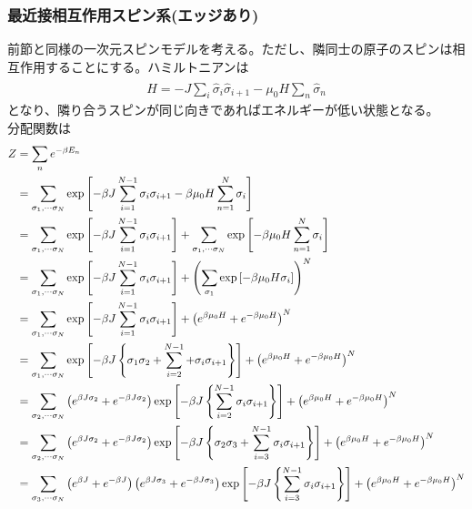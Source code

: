\documentclass{jsarticle}  %
\numberwithin{equation}{section} %
\numberwithin{figure}{section}
\begin{document}
\subsubsection{最近接相互作用スピン系(エッジあり)}
    前節と同様の一次元スピンモデルを考える。ただし、隣同士の原子のスピンは相互作用することにする。ハミルトニアンは
    \begin{align}
        \hat{H} = -J\sum_i \hat{\sigma}_i \hat{\sigma}_{i+1} - \mu_0 H \sum_n \hat{\sigma}_n
    \end{align}
    となり、隣り合うスピンが同じ向きであればエネルギーが低い状態となる。\\
    分配関数は
    \begin{align}
        Z &= \sum_n e^{-\beta E_n} \notag \\
        &= \sum_{\sigma_1, \cdots \sigma_N} \exp \left[ -\beta J\sum_{i=1}^{N-1} \sigma_i \sigma_{i+1} - \beta \mu_0 H \sum_{n=1}^N \sigma_i \right] \notag \\
        &= \sum_{\sigma_1, \cdots \sigma_N} \exp \left[ -\beta J\sum_{i=1}^{N-1} \sigma_i \sigma_{i+1} \right] + \sum_{\sigma_1, \cdots \sigma_N} \exp \left[ - \beta \mu_0 H \sum_{n=1}^N \sigma_i \right] \notag \\
        &= \sum_{\sigma_1, \cdots \sigma_N} \exp \left[ -\beta J\sum_{i=1}^{N-1} \sigma_i \sigma_{i+1} \right] + \left( \sum_{\sigma_1} \exp \left[ - \beta \mu_0 H \sigma_i \right] \right)^N \notag \\
        &= \sum_{\sigma_1, \cdots \sigma_N} \exp \left[ -\beta J\sum_{i=1}^{N-1} \sigma_i \sigma_{i+1} \right] + \left( e^{\beta \mu_0 H} + e^{-\beta \mu_0 H}\right)^N \notag \\
        &= \sum_{\sigma_1, \cdots \sigma_N} \exp \left[ -\beta J \left\{ \sigma_1 \sigma_2 + \sum_{i=2}^{N-1} + \sigma_i \sigma_{i+1}  \right\} \right] + \left( e^{\beta \mu_0 H} + e^{-\beta \mu_0 H}\right)^N \notag \\
        &= \sum_{\sigma_2, \cdots \sigma_N} \left( e^{\beta J\sigma_2} + e^{-\beta J\sigma_2} \right) \exp \left[ -\beta J \left\{ \sum_{i=2}^{N-1}  \sigma_i \sigma_{i+1}  \right\} \right] + \left( e^{\beta \mu_0 H} + e^{-\beta \mu_0 H}\right)^N \notag \\
        &= \sum_{\sigma_2, \cdots \sigma_N} \left( e^{\beta J\sigma_2} + e^{-\beta J\sigma_2} \right) \exp \left[ -\beta J \left\{ \sigma_2 \sigma_3 + \sum_{i=3}^{N-1} \sigma_i \sigma_{i+1}  \right\} \right] + \left( e^{\beta \mu_0 H} + e^{-\beta \mu_0 H}\right)^N \notag \\
        &= \sum_{\sigma_3, \cdots \sigma_N} \left( e^{\beta J} + e^{-\beta J} \right) \left( e^{\beta J\sigma_3} + e^{-\beta J\sigma_3} \right) \exp \left[ -\beta J \left\{ \sum_{i=3}^{N-1} \sigma_i \sigma_{i+1}  \right\} \right] + \left( e^{\beta \mu_0 H} + e^{-\beta \mu_0 H}\right)^N \notag \\

\end{align}
\end{document}
